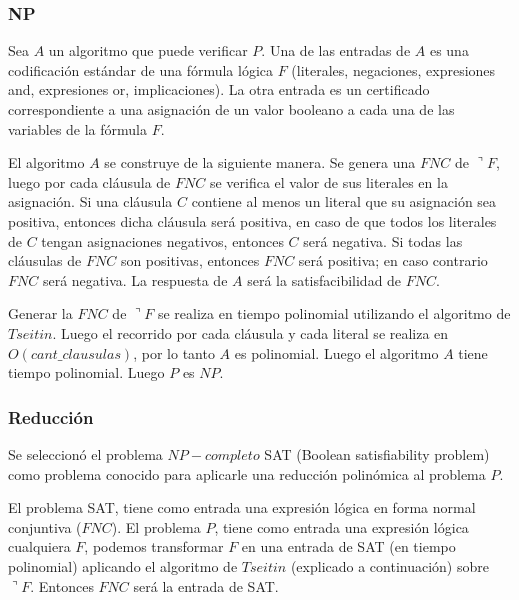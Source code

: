 \documentclass{article}
\begin{document}
        \subsubsection*{NP}

            Sea $A$ un algoritmo que puede verificar $P$. Una de las entradas de $A$ es una 
            codificación estándar de una fórmula lógica $F$ (literales, negaciones, expresiones and, 
            expresiones or, implicaciones). La otra entrada es un certificado correspondiente 
            a una asignación de un valor booleano a cada una de las variables de la fórmula $F$. 

            El algoritmo $A$ se construye de la siguiente manera. Se genera una $FNC$ de $\urcorner F$, luego por 
            cada cláusula de $FNC$ se verifica el valor de sus literales en la asignación. 
            Si una cláusula $C$ contiene al menos un literal que 
            su asignación sea positiva, entonces dicha cláusula será positiva, en caso de que todos los literales
            de $C$ tengan asignaciones negativos, entonces $C$ será negativa. Si todas las cláusulas de $FNC$ 
            son positivas, entonces $FNC$ será positiva; en caso contrario $FNC$ será negativa. La respuesta de $A$
            será la satisfacibilidad de $FNC$. 

            Generar la $FNC$ de $\urcorner F$ se realiza en tiempo polinomial utilizando el algoritmo de $Tseitin$. Luego 
            el recorrido por cada cláusula y cada literal se realiza en $O(cant\_clausulas)$, por lo tanto $A$ es polinomial. 
            Luego el algoritmo $A$ tiene tiempo polinomial. Luego $P$ es $NP$.

        \subsubsection*{Reducción}

            Se seleccionó el problema $NP-completo$ SAT (Boolean satisfiability problem) como problema conocido para 
            aplicarle una reducción polinómica al problema $P$.
            
            El problema SAT, tiene como entrada una expresión lógica en forma normal conjuntiva ($FNC$). El problema $P$, 
            tiene como entrada una expresión lógica cualquiera $F$, podemos transformar $F$ en una entrada de SAT 
            (en tiempo polinomial) aplicando el algoritmo de $Tseitin$ (explicado a continuación) sobre $\urcorner F$. 
            Entonces $FNC$ será la entrada de SAT.
            
\end{document}
